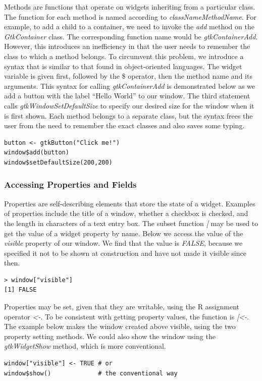 \documentclass[article]{jss}
\begin{document}
Methods are functions that operate on widgets inheriting from a particular class.
The  function for each  method is named according to
\emph{classNameMethodName}. For example, to add a child to a container, we 
need to invoke the \emph{add} method on the \emph{GtkContainer} class. 
The corresponding function name would be \emph{gtkContainerAdd}. However, this 
introduces an inefficiency in that the user needs to remember the class to which
a method belongs. To circumvent this problem, we introduce a syntax that is similar
to that found in object-oriented languages. The widget
variable is given first, followed by the \$ operator, then the method
name and its arguments. This syntax for calling \emph{gtkContainerAdd} is demonstrated 
below as we add a button with the label ``Hello World'' to our window. The
third statement calls \emph{gtkWindowSetDefaultSize} to specify our desired
size for the window when it is first shown. Each method belongs to a separate
class, but the syntax frees the user from the need to remember the exact classes
and also saves some typing.
\begin{verbatim}
button <- gtkButton("Click me!")
window$add(button)
window$setDefaultSize(200,200)
\end{verbatim}

\subsubsection{Accessing Properties and Fields}

Properties are self-describing elements that store the state of a widget.
Examples of properties include the title of a window, whether a checkbox is checked, and
the length in characters of a text entry box. The  subset function 
\emph{[} may be used to get the value of a widget property by name.
Below we access the value of the \emph{visible} property of our window. We
find that the value is \emph{FALSE}, because we specified it not to be shown
at construction and have not made it visible since then.
\begin{verbatim}
> window["visible"]
[1] FALSE
\end{verbatim}

Properties may be set, given that they are writable, using the R assignment 
operator \emph{<-}. To be consistent with getting property values, the function
is \emph{[<-}. The example below makes the window created above visible, using the two
property setting methods. We could also show the window using the 
\emph{gtkWidgetShow} method, which is more conventional.
\begin{verbatim}
window["visible"] <- TRUE # or
window$show()             # the conventional way
\end{verbatim}
\end{document}
